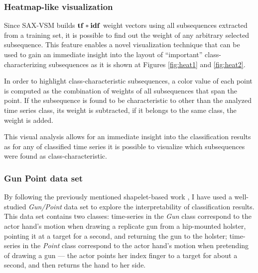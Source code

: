 \subsubsection{Heatmap-like visualization}
Since SAX-VSM builds $\text{\textbf{tf}}\ast\text{\textbf{idf}}$ weight vectors using all subsequences extracted from a
training set, it is possible to find out the weight of any arbitrary selected subsequence.
This feature enables a novel visualization technique that can be used to gain an immediate
insight into the layout of ``important'' class-characterizing subsequences as it is shown at Figures
\ref{fig:heat1} and \ref{fig:heat2}.

In order to highlight class-characteristic subsequences, a color value of each point is computed as the combination of 
\tfidf weights of all subsequences that span the point. If the subsequence is found to be characteristic to other than the 
analyzed time series class, its weight is subtracted, if it belongs to the same class, the weight is added. 

This visual analysis allows for an immediate insight into the classification results as for any of classified time series
it is possible to visualize which subsequences were found as class-characteristic.

\subsubsection{Gun Point data set}
By following the previously mentioned shapelet-based work \cite{citeulike:7344347} \cite{citeulike:11345338}, 
I have used a well-studied \textit{\mbox{Gun/Point}} data set \cite{Ratanamahatana04makingtime-series} to explore the 
interpretability of classification results. This data set contains two classes: 
time-series in the \textit{Gun} class correspond to the actor hand's motion when drawing
a replicate gun from a hip-mounted holster, pointing it at a target for a second, and returning the gun to the holster; 
time-series in the \textit{Point} class correspond to the actor hand's motion when pretending
of drawing a gun --- the actor points her index finger to a target for about a second, and then returns the 
hand to her side. 

